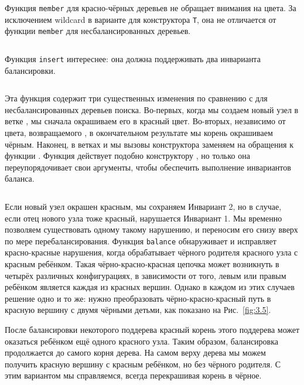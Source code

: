 \begin{frame}[fragile]{}
Функция \lstinline!member! для красно-чёрных деревьев не обращает
внимания на цвета. За исключением wildcard в варианте для конструктора
\lstinline!T!, она не отличается от функции \lstinline!member! для
несбалансированных деревьев.
\inputminted[firstline=18,lastline=21] {haskell}{code/RedBlackSet.lhs}
\end{frame}


\begin{frame}[fragile]{}
Функция \lstinline!insert! интереснее: она должна
поддерживать два инварианта балансировки.

\inputminted[firstline=23,lastline=29] {haskell}{code/RedBlackSet.lhs}

Эта функция содержит три существенных изменения по сравнению с  для
несбалансированных деревьев поиска. Во-первых, когда мы создаем новый
узел в ветке , мы сначала окрашиваем его в красный
цвет. Во-вторых, независимо от цвета, возвращаемого ,
в окончательном результате мы корень окрашиваем чёрным. Наконец, в
ветках  и  мы вызовы конструктора
 заменяем на обращения к функции
. Функция  действует подобно
конструктору , но только она переупорядочивает свои
аргументы, чтобы обеспечить выполнение инвариантов баланса.
\end{frame}


\begin{frame}[fragile]{}
\inputminted[firstline=9,lastline=13] {haskell}{code/RedBlackSet.lhs}

Если новый узел окрашен красным, мы сохраняем Инвариант 2, но в
случае, если отец нового узла тоже красный, нарушается Инвариант 1. Мы
временно позволяем существовать одному такому нарушению, и переносим
его снизу вверх по мере перебалансирования. Функция
\lstinline!balance! обнаруживает и исправляет красно-красные нарушения,
когда обрабатывает чёрного родителя красного узла с красным
ребёнком. Такая чёрно-красно-красная цепочка может возникнуть в
четырёх различных конфигурациях, в зависимости от того, левым или
правым ребёнком является каждая из красных вершин. Однако в каждом из
этих случаев решение одно и то же: нужно преобразовать
чёрно-красно-красный путь в красную вершину с двумя чёрными детьми,
как показано на Рис.~\ref{fig:3.5}.
\end{frame}


\begin{frame}[fragile]{}
После балансировки некоторого поддерева красный корень этого поддерева
может оказаться ребёнком ещё одного красного узла. Таким образом,
балансировка продолжается до самого корня дерева. На самом верху
дерева мы можем получить красную вершину с красным ребёнком, но без
чёрного родителя. С этим вариантом мы справляемся, всегда перекрашивая корень
в чёрное.

\end{frame}


